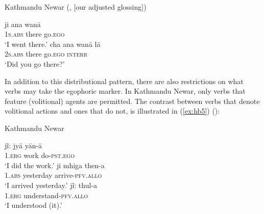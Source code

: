 \documentclass[output=paper]{langsci/langscibook}
\begin{document}
\begin{exe}
\ex Kathmandu Newar (\citealt[95]{Hale1980}, [our adjusted glossing]) 
\label{ex:hb4}
	\begin{xlist}
	\ex 
	\gll ji	ana	wanā\\
	1\textsc{s}.\textsc{abs} there go.\textsc{ego}\\
	\trans ‘I went there.’ 
	\ex 
	\gll cha ana wanā lā \\
	2\textsc{s}.\textsc{abs} there go.\textsc{ego} \textsc{interr}\\
	\trans ‘Did you go there?’ 	
	\end{xlist}
\end{exe}

In addition to this distributional pattern, there are also restrictions on what verbs may take the egophoric marker. In Kathmandu Newar, only verbs that feature (volitional) agents are permitted. The contrast between verbs that denote volitional actions and ones that do not, is illustrated in (\ref{ex:hb5}) (\citealt[12--13]{Hargreaves2005}):

\begin{exe}
\ex Kathmandu Newar\label{ex:hb5}
	\begin{xlist}
	\ex 
	\gll jĩ:	jyā	yān-ā\\
	1.\textsc{erg} work	do-\textsc{pst}.\textsc{ego}\\
	\trans ‘I did the work.’ 
	\ex 
	\gll ji mhiga then-a\\
	1.\textsc{abs} yesterday arrive-\textsc{pfv}.\textsc{allo}\\
	\trans ‘I arrived yesterday.’ 	
	\ex 
	\gll jĩ:	thul-a\\
	1.\textsc{erg} understand-\textsc{pfv}.\textsc{allo}\\
	\trans ‘I understood (it).’ 
	\end{xlist}
\end{exe}
\end{document}
